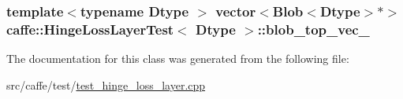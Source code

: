 \hypertarget{classcaffe_1_1_hinge_loss_layer_test_ae5653c7c55dff58664cfe3ad8093757e}{
\subsubsection[{blob\+\_\+top\+\_\+vec\+\_\+}]{\setlength{\rightskip}{0pt plus 5cm}template$<$typename Dtype $>$ vector$<${\bf Blob}$<$Dtype$>$$\ast$$>$ {\bf caffe\+::\+Hinge\+Loss\+Layer\+Test}$<$ Dtype $>$\+::blob\+\_\+top\+\_\+vec\+\_\+\hspace{0.3cm}{\ttfamily [protected]}}}\label{classcaffe_1_1_hinge_loss_layer_test_ae5653c7c55dff58664cfe3ad8093757e}


The documentation for this class was generated from the following file\+:\begin{DoxyCompactItemize}
\item 
src/caffe/test/\hyperlink{test__hinge__loss__layer_8cpp}{test\+\_\+hinge\+\_\+loss\+\_\+layer.\+cpp}\end{DoxyCompactItemize}
